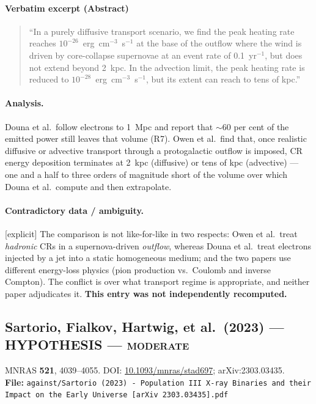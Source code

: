 \documentclass[11pt,a4paper]{article}
\newcommand{\HYP}{\textcolor{blue!60!black}{\textbf{HYPOTHESIS}}}
\newcommand{\flag}[1]{\textcolor{orange!75!black}{\textsf{\small [#1]}}}
\begin{document}
\paragraph{Verbatim excerpt (Abstract)}
\begin{quote}\small
``In a purely diffusive transport scenario, we find the peak heating rate
reaches $10^{-26}$~erg~cm$^{-3}$~s$^{-1}$ at the base of the outflow where the
wind is driven by core-collapse supernovae at an event rate of
0.1~yr$^{-1}$, but does not extend beyond 2~kpc. In the advection limit, the
peak heating rate is reduced to $10^{-28}$~erg~cm$^{-3}$~s$^{-1}$, but its
extent can reach to tens of kpc.''
\end{quote}

\paragraph{Analysis.}
Douna et al.\ follow electrons to 1~Mpc and report that $\sim60$ per cent of the
emitted power still leaves that volume (R7). Owen et al.\ find that, once
realistic diffusive or advective transport through a protogalactic outflow is
imposed, CR energy deposition terminates at 2~kpc (diffusive) or tens of kpc
(advective) --- one and a half to three orders of magnitude short of the volume
over which Douna et al.\ compute and then extrapolate.

\paragraph{Contradictory data / ambiguity.} \flag{explicit}
The comparison is not like-for-like in two respects: Owen et al.\ treat
\emph{hadronic} CRs in a supernova-driven \emph{outflow}, whereas Douna et al.\
treat electrons injected by a jet into a static homogeneous medium; and the two
papers use different energy-loss physics (pion production vs.\ Coulomb and
inverse Compton). The conflict is over what transport regime is appropriate, and
neither paper adjudicates it. \textbf{This entry was not independently
recomputed.}

\subsection{Sartorio, Fialkov, Hartwig, et al.\ (2023) --- \HYP{} --- \textsc{moderate}}
\noindent MNRAS \textbf{521}, 4039--4055. DOI:
\href{https://doi.org/10.1093/mnras/stad697}{10.1093/mnras/stad697};
arXiv:2303.03435.\\
\textbf{File:} \texttt{against/Sartorio (2023) - Population III X-ray Binaries and their Impact on the Early Universe [arXiv 2303.03435].pdf}
\end{document}
